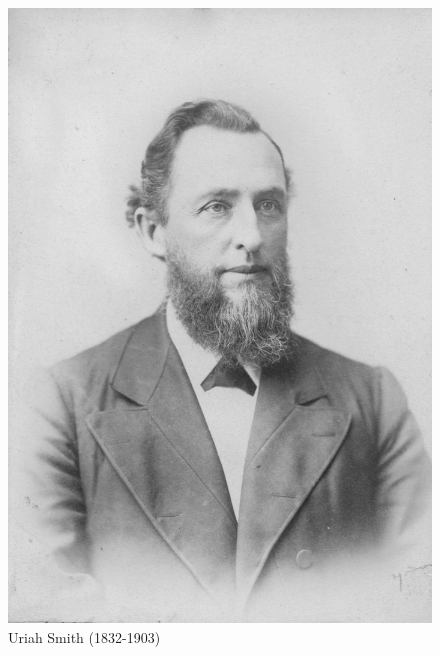 \begin{figure}[hp]
    \centering
    \includegraphics[width=1\linewidth]{images/uriah-smith.jpg}
    \caption*{Uriah Smith (1832-1903)}
    \label{fig:uriah-smith}
\end{figure}


